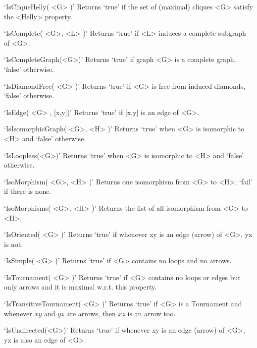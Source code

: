 `IsCliqueHelly( <G> )'\newline\hglue 5mm 
Returns  `true'  if  the  set of (maximal) cliques <G> satisfy the <Helly> property.

`IsComplete( <G>, <L> )'\newline\hglue 5mm 
Returns `true' if <L> induces a complete subgraph of <G>.

`IsCompleteGraph(<G>)'\newline\hglue 5mm 
Returns  `true'  if graph <G> is a complete graph, `false' otherwise.

`IsDiamondFree( <G> )'\newline\hglue 5mm 
Returns `true' if <G> is free from induced diamonds, `false' otherwise.

`IsEdge( <G> , [x,y])'\newline\hglue 5mm 
Returns `true' if [x,y] is an edge of <G>.

`IsIsomorphicGraph( <G>, <H> )'\newline\hglue 5mm 
Returns `true' when <G> is isomorphic to <H> and `false' otherwise.

`IsLoopless(<G>)'\newline\hglue 5mm 
Returns `true' when <G> is isomorphic to <H> and `false' otherwise.

`IsoMorphism( <G>, <H> )'\newline\hglue 5mm 
Returns one isomorphism from <G> to <H>; `fail' if there is none.

`IsoMorphisms( <G>, <H> )'\newline\hglue 5mm 
Returns  the  list  of  all  isomorphism  from  <G> to <H>.

`IsOriented( <G> )'\newline\hglue 5mm 
Returns `true' if whenever xy is an edge (arrow)  of <G>, yx is not.

`IsSimple( <G> )'\newline\hglue 5mm 
Returns `true' if <G> contains no loops and no arrows.

`IsTournament( <G> )'\newline\hglue 5mm 
Returns `true' if <G> contains no loops or edges but only arrows and it is maximal w.r.t. this property.

`IsTransitiveTournament( <G> )'\newline\hglue 5mm 
Returns `true' if <G> is a Tournament and whenever $xy$ and $yz$ are arrows, then $xz$ is an arrow too.

`IsUndirected(<G>)'\newline\hglue 5mm 
Returns `true' if whenever xy is an edge (arrow) of <G>, yx is also an edge of <G>.

